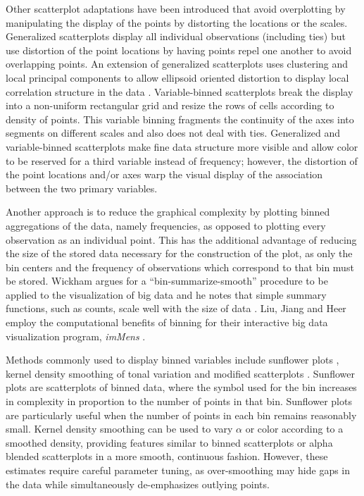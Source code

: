 Other scatterplot adaptations have been introduced that avoid overplotting by manipulating the display of the points by distorting the locations or the scales. Generalized scatterplots \citep{Keim2010GenScatter} display all individual observations (including ties) but use distortion of the point locations by having points repel one another to avoid overlapping points.  An extension of generalized scatterplots uses clustering and local principal components to allow ellipsoid oriented distortion to display local correlation structure in the data \citep{Janetzko2013Ellipse}. Variable-binned scatterplots \citep{Hao2010visual} break the display into a non-uniform rectangular grid and resize the rows of cells according to density of points. This variable binning fragments the continuity of the axes into  segments on different scales and also does not deal with ties. Generalized and variable-binned scatterplots make fine data structure more visible and allow color to be reserved for a third variable instead of frequency; however, the distortion of the point locations and/or axes warp the visual display of the association between the two primary variables.

Another approach is to reduce the graphical complexity by plotting binned aggregations of the data, namely frequencies, as opposed to plotting every observation as an individual point. This has the additional advantage of reducing the size of the stored data necessary for the construction of the plot, as only the bin centers and the frequency of observations which correspond to that bin must be stored. Wickham argues for a ``bin-summarize-smooth'' procedure to be applied to the visualization of big data and he notes that simple summary functions, such as counts, scale  well with the size of data \citep{Wickham2013Bin}. Liu, Jiang and Heer employ the computational benefits of binning for their interactive big data visualization program, \textit{imMens} \citep{Liu2013imMens}.  

Methods commonly used to display binned variables include sunflower plots \citep{sunflowerplots}, kernel density smoothing of tonal variation and modified scatterplots \citep{martin-gold}.  Sunflower plots are scatterplots of binned data, where the symbol used for the bin increases in complexity in proportion to the number of points in that bin. Sunflower plots are particularly useful when the number of points in each bin remains reasonably small. Kernel density smoothing can be used to vary $\alpha$ or color according to a smoothed density, providing features similar to binned scatterplots or alpha blended scatterplots in a more smooth, continuous fashion. However, these estimates require careful parameter tuning, as over-smoothing may hide gaps in the data while simultaneously de-emphasizes outlying points.

